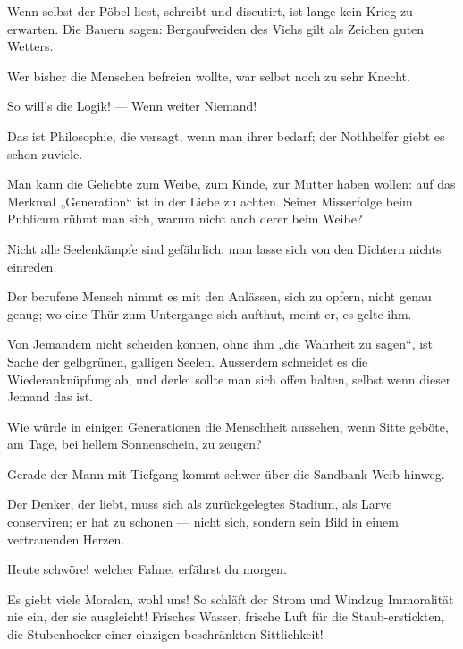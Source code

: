 Wenn selbst der Pöbel liest, schreibt und discutirt, ist lange kein Krieg zu erwarten. Die Bauern sagen: Bergaufweiden des Viehs gilt als Zeichen guten Wetters.
\par

Wer bisher die Menschen befreien wollte, war selbst noch zu sehr Knecht.
\par

So will’s die Logik! — Wenn weiter Niemand!
\par

Das ist Philosophie, die versagt, wenn man ihrer bedarf; der Nothhelfer giebt es schon zuviele.
\par

Man kann die Geliebte zum Weibe, zum Kinde, zur Mutter haben wollen: auf das Merkmal „Generation“ ist in der Liebe zu achten. Seiner Misserfolge beim Publicum rühmt man sich, warum nicht auch derer beim Weibe?
\par

Nicht alle Seelenkämpfe sind gefährlich; man lasse sich von den Dichtern nichts einreden.
\par

Der berufene Mensch nimmt es mit den Anlässen, sich zu opfern, nicht genau genug; wo eine Thür zum Untergange sich aufthut, meint er, es gelte ihm.
\par

Von Jemandem nicht scheiden können, ohne ihm „die Wahrheit zu sagen“, ist Sache der gelbgrünen, galligen Seelen. Ausserdem schneidet es die Wiederanknüpfung ab, und derlei sollte man sich offen halten, selbst wenn dieser Jemand das  ist.
\par

Wie würde in einigen Generationen die Menschheit aussehen, wenn Sitte geböte, am Tage, bei hellem Sonnenschein, zu zeugen?
\par

Gerade der Mann mit Tiefgang kommt schwer über die Sandbank Weib hinweg.
\par

Der Denker, der liebt, muss sich als zurückgelegtes Stadium, als Larve conserviren; er hat zu schonen — nicht sich, sondern sein Bild in einem vertrauenden Herzen.
\par

Heute schwöre! welcher Fahne, erfährst du morgen.
\par

Es giebt viele Moralen, wohl uns! So schläft der Strom und Windzug Immoralität nie ein, der sie ausgleicht! Frisches Wasser, frische Luft für die Staub-erstickten, die Stubenhocker einer einzigen beschränkten Sittlichkeit!
\par

